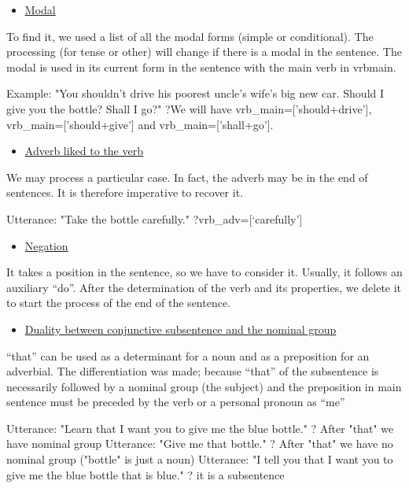 \documentclass[twoside,a4paper,10pt]{report}
\newcommand{\dokuunderline}[1]{\underline{#1}}
\newcommand{\dokuitem}{\item}
\begin{document}
\begin{itemize}
\dokuitem  \dokuunderline{Modal}
\end{itemize}
To find it, we used a list of all the modal forms (simple or conditional).
The processing (for tense or other) will change if there is a modal in the sentence. The modal is used in its current form in the sentence with the main verb in vrb{\textunderscore}main.


\small
\begin{verbatimtab}
  Example: "You shouldn't drive his poorest uncle's wife's big new car. Should I give you the
bottle? Shall I go?"
  ?We will have vrb_main=['should+drive'], vrb_main=['should+give'] and vrb_main=['shall+go'].
\end{verbatimtab}
\normalsize

\begin{itemize}
\dokuitem  \dokuunderline{Adverb liked to the verb}
\end{itemize}
We may process a particular case. In fact, the adverb may be in the end of sentences. It is therefore imperative to recover it.


\small
\begin{verbatimtab}
  Utterance: "Take the bottle carefully."
  ?vrb_adv=[‘carefully’]
\end{verbatimtab}
\normalsize

\begin{itemize}
\dokuitem  \dokuunderline{Negation}
\end{itemize}
It takes a position in the sentence, so we have to consider it. Usually, it follows an auxiliary “do”. After the determination of the verb and its properties, we delete it to start the process of the end of the sentence.



\begin{itemize}
\dokuitem  \dokuunderline{Duality between conjunctive subsentence and the nominal group}
\end{itemize}
“that” can be used as a determinant for a noun and as a preposition for an adverbial. The differentiation was made; because “that” of the subsentence is necessarily followed by a nominal group (the subject) and the preposition in main sentence must be preceded by the verb or a personal pronoun as “me”


\small
\begin{verbatimtab}
  Utterance: "Learn that I want you to give me the blue bottle." ? After "that" we have nominal
group
  Utterance: "Give me that bottle." ? After "that" we have no nominal group ("bottle" is just a
noun)
  Utterance: "I tell you that I want you to give me the blue bottle that is blue." ? it is a
subsentence
\end{verbatimtab}
\normalsize
\end{document}
